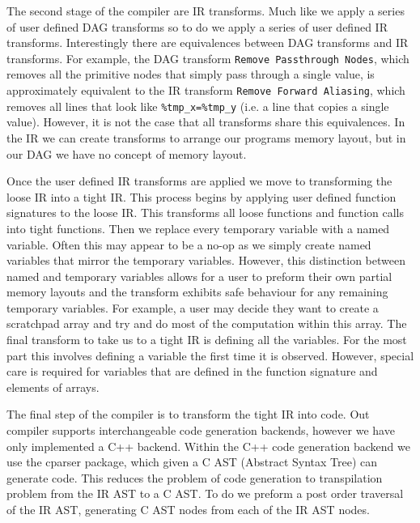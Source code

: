The second stage of the compiler are IR transforms.
Much like we apply a series of user defined DAG transforms so to do we apply a series of user defined IR transforms.
Interestingly there are equivalences between DAG transforms and IR transforms.
For example, the DAG transform \texttt{Remove Passthrough Nodes}, which removes all the primitive nodes that simply pass through a single value, is approximately equivalent to the IR transform \texttt{Remove Forward Aliasing}, which removes all lines that look like \lstinline{%tmp_x=%tmp_y} (i.e. a line that copies a single value).
However, it is not the case that all transforms share this equivalences.
In the IR we can create transforms to arrange our programs memory layout, but in our DAG we have no concept of memory layout.

Once the user defined IR transforms are applied we move to transforming the loose IR into a tight IR.
This process begins by applying user defined function signatures to the loose IR.
This transforms all loose functions and function calls into tight functions.
Then we replace every temporary variable with a named variable.
Often this may appear to be a no-op as we simply create named variables that mirror the temporary variables.
However, this distinction between named and temporary variables allows for a user to preform their own partial memory layouts and the transform exhibits safe behaviour for any remaining temporary variables.
For example, a user may decide they want to create a scratchpad array and try and do most of the computation within this array.
The final transform to take us to a tight IR is defining all the variables.
For the most part this involves defining a variable the first time it is observed.
However, special care is required for variables that are defined in the function signature and elements of arrays.

The final step of the compiler is to transform the tight IR into code.
Out compiler supports interchangeable code generation backends, however we have only implemented a C++ backend.
Within the C++ code generation backend we use the cparser package, which given a C AST (Abstract Syntax Tree) can generate code.
This reduces the problem of code generation to transpilation problem from the IR AST to a C AST.
To do we preform a post order traversal of the IR AST, generating C AST nodes from each of the IR AST nodes.